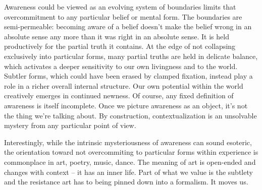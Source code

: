 \documentclass[12pt]{article}
\begin{document}
Awareness could be viewed as an evolving system of boundaries limits that overcommitment to any particular belief or mental form. The boundaries are semi-permeable: becoming aware of a belief doesn't make the belief wrong in an absolute sense any more than it was right in an absolute sense. It is held productively for the partial truth it contains. At the edge of not collapsing exclusively into particular forms, many partial truths are held in delicate balance, which activates a deeper sensitivity to our own livingness and to the world. Subtler forms, which could have been erased by clamped fixation, instead play a role in a richer overall internal structure. Our own potential within the world creatively emerges in continued newness. Of course, any fixed definition of awareness is itself incomplete. Once we picture awareness as an object, it's not the thing we're talking about. By construction, contextualization is an unsolvable mystery from any particular point of view.

Interestingly, while the intrinsic mysteriousness of awareness can sound esoteric, the orientation toward not overcommiting to particular forms within experience is commonplace in art, poetry, music, dance. The meaning of art is open-ended and changes with context -- it has an inner life. Part of what we value is the subtlety and the resistance art has to being pinned down into a formalism. It moves us.







\end{document}
